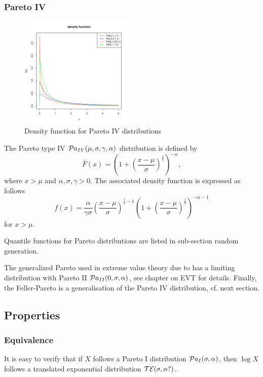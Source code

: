 \subsubsection{Pareto IV}
\begin{figure}
  \vspace{-20pt}
  \begin{center}
    \includegraphics[width=0.48\textwidth]{img/pareto4zoom}
  \end{center}
  \vspace{-20pt}  
  \caption{Density function for Pareto IV distributions}
  \vspace{-20pt}  
\end{figure}
The Pareto type IV $\mathcal Pa_{IV}(\mu, \sigma, \gamma, \alpha)$ distribution is defined by
$$
\bar F(x)  = \left(1+\left(\frac{x-\mu}{\sigma}\right)^{\frac{1}{\gamma}}\right)^{-\alpha},
$$
where $x>\mu$ and $\alpha,\sigma, \gamma>0$. The associated density function is expressed as follows
$$
f(x) = \frac{\alpha}{\gamma\sigma} \left(\frac{x-\mu}{\sigma}\right)^{\frac{1}{\gamma}-1} \left(1+\left(\frac{x-\mu}{\sigma}\right)^{\frac{1}{\gamma}}\right)^{-\alpha-1}
$$
for $x>\mu$.

Quantile functions for Pareto distributions are listed in sub-section random generation.

The generalized Pareto used in extreme value theory due to \cite{pickands} has a limiting distribution with Pareto II $\mathcal Pa_{II}(0, \sigma, \alpha)$, see chapter on EVT for details. Finally, the Feller-Pareto is a generalisation of the Pareto IV distribution, cf. next section.

\subsection{Properties}

\subsubsection{Equivalence}
It is easy to verify that if $X$ follows a Pareto I distribution $\mathcal Pa_I(\sigma, \alpha)$, then $\log X$ follows a translated exponential distribution $\mathcal T\mathcal E(\sigma, \alpha ?)$.

